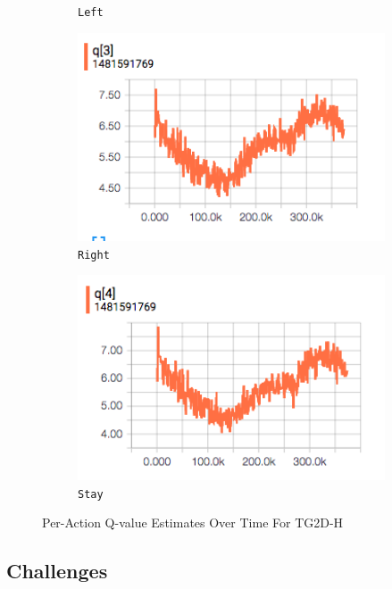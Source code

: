 \documentclass[9pt,journal]{IEEEtran}
\begin{document}
\begin{figure}[ht]
\begin{subfigure}{0.19\textwidth}
    \caption*{\texttt{Left}}
    \centering
  \end{subfigure}
  \begin{subfigure}{0.19\textwidth}
    \includegraphics[width=1\textwidth]{report/TG2D-H_action_q/q3}
    \caption*{\texttt{Right}}
    \centering
  \end{subfigure}
  \begin{subfigure}{0.19\textwidth}
    \includegraphics[width=1\textwidth]{report/TG2D-H_action_q/q4}
    \caption*{\texttt{Stay}}
    \centering
  \end{subfigure}
  \centering
  \caption{Per-Action Q-value Estimates Over Time For TG2D-H}
  \label{fig:maxperaqv}
\end{figure}

\subsection{Challenges}
\end{document}
